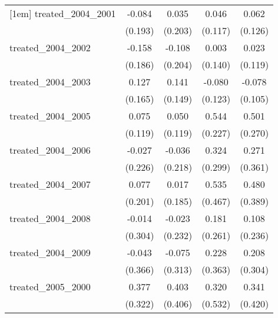 {\begin{tabular}{l*{4}{c}}
[1em]
treated\_2004\_2001&      -0.084         &       0.035         &       0.046         &       0.062         \\
            &     (0.193)         &     (0.203)         &     (0.117)         &     (0.126)         \\
[1em]
treated\_2004\_2002&      -0.158         &      -0.108         &       0.003         &       0.023         \\
            &     (0.186)         &     (0.204)         &     (0.140)         &     (0.119)         \\
[1em]
treated\_2004\_2003&       0.127         &       0.141         &      -0.080         &      -0.078         \\
            &     (0.165)         &     (0.149)         &     (0.123)         &     (0.105)         \\
[1em]
treated\_2004\_2005&       0.075         &       0.050         &       0.544\sym{*}  &       0.501         \\
            &     (0.119)         &     (0.119)         &     (0.227)         &     (0.270)         \\
[1em]
treated\_2004\_2006&      -0.027         &      -0.036         &       0.324         &       0.271         \\
            &     (0.226)         &     (0.218)         &     (0.299)         &     (0.361)         \\
[1em]
treated\_2004\_2007&       0.077         &       0.017         &       0.535         &       0.480         \\
            &     (0.201)         &     (0.185)         &     (0.467)         &     (0.389)         \\
[1em]
treated\_2004\_2008&      -0.014         &      -0.023         &       0.181         &       0.108         \\
            &     (0.304)         &     (0.232)         &     (0.261)         &     (0.236)         \\
[1em]
treated\_2004\_2009&      -0.043         &      -0.075         &       0.228         &       0.208         \\
            &     (0.366)         &     (0.313)         &     (0.363)         &     (0.304)         \\
[1em]
treated\_2005\_2000&       0.377         &       0.403         &       0.320         &       0.341         \\
            &     (0.322)         &     (0.406)         &     (0.532)         &     (0.420)         \\

\end{tabular}}
